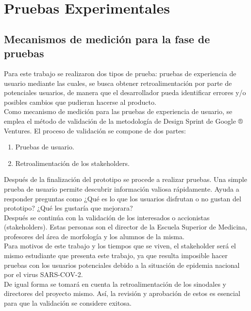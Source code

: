 \chapter{Pruebas Experimentales}

\section{Mecanismos de medición para la fase de pruebas}
Para este trabajo se realizaron dos tipos de prueba: pruebas de experiencia de usuario mediante las cuales, se busca obtener retroalimentación por parte de potenciales usuarios, de manera que el desarrollador pueda identificar errores y/o posibles cambios que pudieran hacerse al producto. \\

Como mecanismo de medición para las pruebas de experiencia de usuario, se emplea el método de validación de la metodología de Design Sprint de Google ® Ventures\cite{web16}. El proceso de validación se compone de dos partes:\\
\begin{enumerate}
    \item Pruebas de usuario.
    \item Retroalimentación de los stakeholders.
\end{enumerate}
Después de la finalización del prototipo se procede a realizar pruebas. Una simple prueba de usuario permite descubrir información valiosa rápidamente. 
Ayuda a responder preguntas como ¿Qué es lo que los usuarios disfrutan o no gustan del prototipo? ¿Qué les gustaría que mejorara? \\
Después se continúa con la validación de los interesados o accionistas (stakeholders). Estas personas son el director de la Escuela Superior de Medicina, 
profesores del área de morfología y los alumnos de la misma. \\
Para motivos de este trabajo y los tiempos que se viven, el stakeholder será el mismo estudiante que presenta este trabajo, 
ya que resulta imposible hacer pruebas con los usuarios potenciales debido a la situación de epidemia nacional por el virus SARS-COV-2.\\
De igual forma se tomará en cuenta la retroalimentación de los sinodales y directores del proyecto mismo. Así, la revisión y aprobación de 
estos es esencial para que la validación se considere exitosa.\\


